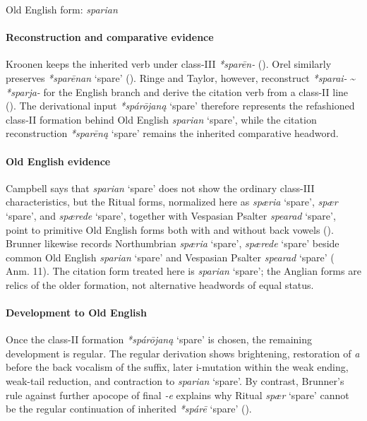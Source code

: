 \documentclass[
  british,
  a4paper,
]{article}
\providecommand{\Recon}[1]{\emph{*#1}}
\begin{document}
Old English form: \emph{sparian}

\paragraph{Reconstruction and comparative
evidence}\label{reconstruction-and-comparative-evidence-112}

Kroonen keeps the inherited verb under class-III {\emph{*sparēn-}}
(). Orel similarly
preserves \Recon{sparēnan} `spare' (). Ringe and Taylor, however, reconstruct \Recon{sparai-}
\textasciitilde{} \Recon{sparja-} for the English branch and derive the
citation verb from a class-II line (). The derivational input \Recon{spárōjaną}
`spare' therefore represents the refashioned class-II formation behind
Old English {\emph{sparian}} `spare', while the citation reconstruction
\Recon{sparēną} `spare' remains the inherited comparative headword.

\paragraph{Old English evidence}\label{old-english-evidence-114}

Campbell says that {\emph{sparian}} `spare' does not show the ordinary
class-III characteristics, but the Ritual forms, normalized here as
{\emph{spæria}} `spare', {\emph{spær}} `spare', and {\emph{spærede}}
`spare', together with Vespasian Psalter {\emph{spearad}} `spare', point
to primitive Old English forms both with and without back vowels
(). Brunner
likewise records Northumbrian {\emph{spæria}} `spare', {\emph{spærede}}
`spare' beside common Old English {\emph{sparian}} `spare' and Vespasian
Psalter {\emph{spearad}} `spare'
( Anm. 11).
The citation form treated here is {\emph{sparian}} `spare'; the Anglian
forms are relics of the older formation, not alternative headwords of
equal status.

\paragraph{Development to Old
English}\label{development-to-old-english-112}

Once the class-II formation \Recon{spárōjaną} `spare' is chosen, the
remaining development is regular. The regular derivation shows
brightening, restoration of \emph{a} before the back vocalism of the
suffix, later i-mutation within the weak ending, weak-tail reduction,
and contraction to {\emph{sparian}} `spare'. By contrast, Brunner's rule
against further apocope of final \emph{-e} explains why Ritual
{\emph{spær}} `spare' cannot be the regular continuation of inherited
\Recon{spárē} `spare' ().
\end{document}

